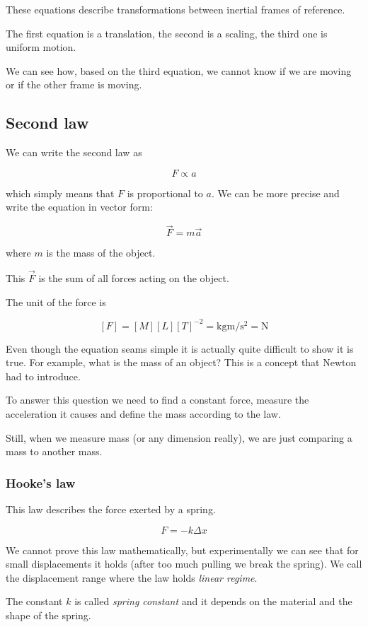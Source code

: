\documentclass[14pt]{extarticle}
\begin{document}
These equations describe transformations between inertial frames of reference.

The first equation is a translation, the second is a scaling, the third one is uniform motion.

We can see how, based on the third equation, we cannot know if we are moving or if the other frame is moving.

\subsection{Second law}

We can write the second law as

$$
  F \propto a
$$

which simply means that $F$ is proportional to $a$.
We can be more precise and write the equation in vector form:

$$
  \vec F = m \vec a
$$

where $m$ is the mass of the object.

This $\vec F$ is the sum of all forces acting on the object.

The unit of the force is

$$
  [F] = [M][L][T]^{-2} = \si{\kilogram \meter \per \second \squared} = \si{\newton}
$$

Even though the equation seams simple it is actually quite difficult to show it is true.
For example, what is the mass of an object? This is a concept that Newton had to introduce.

To answer this question we need to find a constant force, measure the acceleration it causes and define the mass according to the law.

Still, when we measure mass (or any dimension really), we are just comparing a mass to another mass.

\subsubsection{Hooke's law}

This law describes the force exerted by a spring.

$$
  F = - k \Delta x
$$

We cannot prove this law mathematically, but experimentally we can see that for small displacements it holds (after too much pulling we break the spring).
We call the displacement range where the law holds \textit{linear regime}.

The constant $k$ is called \textit{spring constant} and it depends on the material and the shape of the spring.
\end{document}
